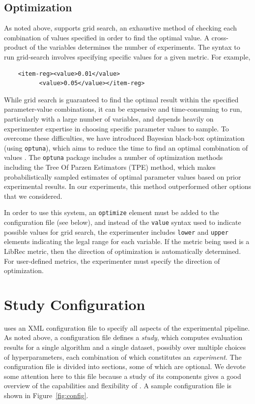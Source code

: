 \subsection{Optimization}
\label{subsec:libauto_opt}

As noted above, \libauto{} supports grid search, an exhaustive method of checking each combination of values specified in order to find the optimal value. A cross-product of the variables determines the number of experiments. The syntax to run grid-search involves specifying specific values for a given metric. For example,

{\small
\begin{verbatim}
    <item-reg><value>0.01</value>
          <value>0.05</value></item-reg> 
\end{verbatim}
}

While grid search is guaranteed to find the optimal result within the specified parameter-value combinations, it can be expensive and time-consuming to run, particularly with a large number of variables, and depends heavily on experimenter expertise in choosing specific parameter values to sample. To overcome these difficulties, we have introduced Bayesian black-box optimization (using \texttt{optuna}), which aims to reduce the time to find an optimal combination of values \cite{akiba2019optuna}. The \texttt{optuna} package includes a number of optimization methods including the Tree Of Parzen Estimators (TPE) method, which makes probabilistically sampled estimates of optimal parameter values based on prior experimental results. In our experiments, this method outperformed other options that we considered. 

In order to use this system, an \texttt{optimize} element must be added to the configuration file (see below), and instead of the \texttt{value} syntax used to indicate possible values for grid search, the experimenter includes \texttt{lower} and \texttt{upper} elements indicating the legal range for each variable. If the metric being used is a LibRec metric, then the direction of optimization is automatically determined. For user-defined metrics, the experimenter must specify the direction of optimization.

\section{Study Configuration}
\label{sec:libauto_study_config}

\libauto{} uses an XML configuration file to specify all aspects of the experimental pipeline. As noted above, a configuration file defines a \textit{study}, which computes evaluation results for a single algorithm and a single dataset, possibly over multiple choices of hyperparameters, each combination of which constitutes an \textit{experiment}. The configuration file is divided into sections, some of which are optional. We devote some attention here to this file because a study of its components gives a good overview of the capabilities and flexibility of \libauto{}. A sample configuration file is shown in Figure~\ref{fig:config}.

